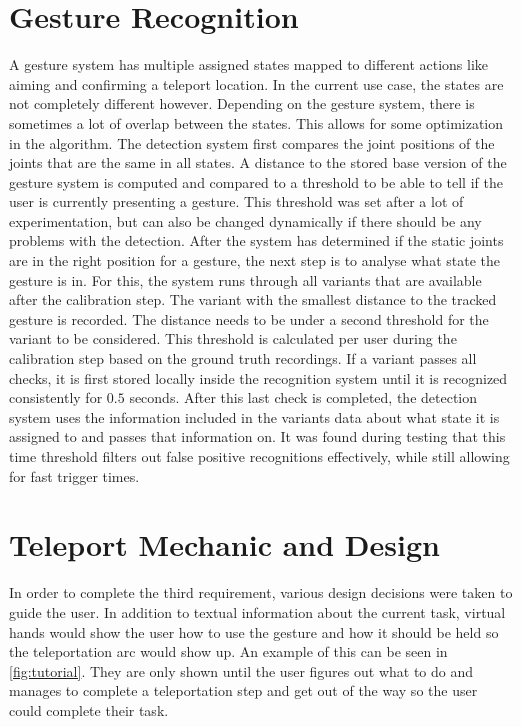 \section{Gesture Recognition}
A gesture system has multiple assigned states mapped to different actions like aiming and confirming a teleport location. In the current use case, the states are not completely different however. Depending on the gesture system, there is sometimes a lot of overlap between the states. This allows for some optimization in the algorithm. The detection system first compares the joint positions of the joints that are the same in all states. A distance to the stored base version of the gesture system is computed and compared to a threshold to be able to tell if the user is currently presenting a gesture. This threshold was set after a lot of experimentation, but can also be changed dynamically if there should be any problems with the detection. After the system has determined if the static joints are in the right position for a gesture, the next step is to analyse what state the gesture is in. For this, the system runs through all variants that are available after the calibration step. The variant with the smallest distance to the tracked gesture is recorded. The distance needs to be under a second threshold for the variant to be considered. This threshold is calculated per user during the calibration step based on the ground truth recordings. If a variant passes all checks, it is first stored locally inside the recognition system until it is recognized consistently for $0.5$ seconds. After this last check is completed, the detection system uses the information included in the variants data about what state it is assigned to and passes that information on. It was found during testing that this time threshold filters out false positive recognitions effectively, while still allowing for fast trigger times.


\section{Teleport Mechanic and Design}
In order to complete the third requirement, various design decisions were taken to guide the user. In addition to textual information about the current task, virtual hands would show the user how to use the gesture and how it should be held so the teleportation arc would show up. An example of this can be seen in \ref{fig:tutorial}. They are only shown until the user figures out what to do and manages to complete a teleportation step and get out of the way so the user could complete their task.

